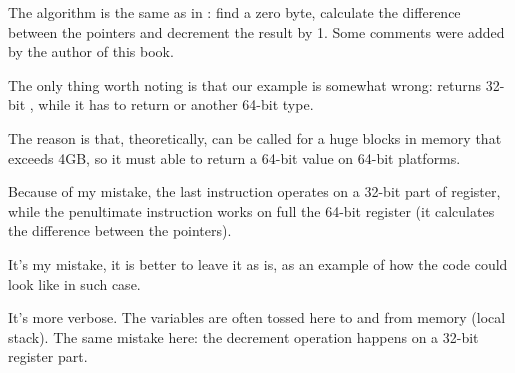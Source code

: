 ﻿




The algorithm is the same as in : 
find a zero 
byte, calculate the difference between the pointers and decrement the result by 1.
Some comments were added by the author of this book.

The only thing worth noting is that our example is somewhat wrong: 
returns 32-bit \Tint, while it has to return  or another 64-bit type.

The reason is that, theoretically,  can be called for a huge blocks in memory that exceeds
4GB, so it must able to return a 64-bit value on 64-bit platforms.

Because of my mistake, the last \SUB instruction operates on a 32-bit part of register, while the penultimate
\SUB instruction works on full the 64-bit register (it calculates the difference between the pointers).

It's my mistake, it is better to leave it as is, as an example of how the code could look like in such case.




It's more verbose.
The variables are often tossed here to and from memory (local stack).
The same mistake here: the decrement operation happens on a 32-bit register part.

